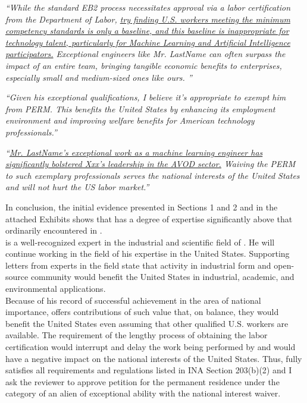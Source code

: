 \documentclass[11pt]{article}
\let\oldenquote\enquote
\renewcommand{\enquote}[1]{{\itshape\oldenquote{#1}}}
\begin{document}
\enquote{While the standard EB2 process necessitates approval via a labor certification from the Department of Labor, \ul{try finding U.S. workers meeting the minimum competency standards is only a baseline, and this baseline is inappropriate for technology talent, particularly for Machine Learning and Artificial Intelligence participators.} Exceptional engineers like Mr. LastName can often surpass the impact of an entire team, bringing tangible economic benefits to enterprises, especially small and medium-sized ones like ours. } 


\enquote{Given his exceptional qualifications, I believe it's appropriate to exempt him from PERM. This benefits the United States by enhancing its employment environment and improving welfare benefits for American technology professionals.} 

\enquote{\ul{Mr. LastName's exceptional work as a machine learning engineer has significantly bolstered Xxx's leadership in the AVOD sector.} Waiving the PERM to such exemplary professionals serves the national interests of the United States and will not hurt the US labor market.} 



In conclusion, the initial evidence presented in Sections 1 and 2 and in the attached Exhibits shows that \dr has a degree of expertise significantly above that ordinarily encountered in \fie{}. \\

\dr is a well-recognized expert in the industrial and scientific field of \fie{}. He will continue working in the field of his expertise in the United States. Supporting letters from experts in the field state that \drs activity in industrial form and open-source community would benefit the United States in industrial, academic, and environmental applications. \\


Because of his record of successful achievement in the area of national importance, \dr offers contributions of such value that, on balance, they would benefit the United States even assuming that other qualified U.S. workers are available. The requirement of the lengthy process of obtaining the labor certification would interrupt and delay the work being performed by \dr and would have a negative impact on the national interests of the United States.
Thus, \dr fully satisfies all requirements and regulations listed in INA Section 203(b)(2) and I ask the reviewer to approve \drs petition for the permanent residence under the category of an alien of exceptional ability with the national interest waiver. \\
\end{document}
